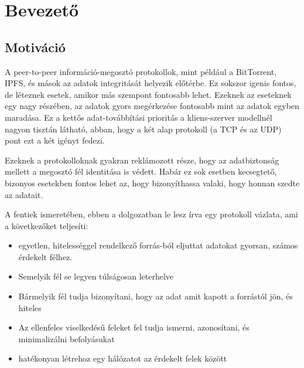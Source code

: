 \chapter{Bevezet\H{o}}\label{ch:BEV}

\section{Motiváció}\label{sec:BEV:mot}

A peer-to-peer információ-megosztó protokollok,
mint például a BitTorrent, IPFS, és mások az
adatok integritását helyezik el\H{o}térbe. Ez
sokszor igenis fontos, de léteznek esetek,
amikor más szempont fontosabb lehet. Ezeknek az
eseteknek egy nagy részében, az adatok gyors
megérkezése fontosabb mint az adatok egyben
maradása. Ez a kett\H{o}s adat-továbbítási
prioritás a kliens-szerver modellnél nagyon
tisztán látható, abban, hogy a két alap
protokoll (a TCP és az UDP) pont ezt a két
igényt fedezi.

Ezeknek a protokolloknak gyakran reklámozott
része, hogy az adatbiztonság mellett a megosztó
fél identitása is védett. Habár ez sok esetben
kecsegtet\H{o}, bizonyos esetekben fontos lehet az,
hogy bizonyíthassa valaki, hogy honnan szedte az
adatait.

A fentiek ismeretében, ebben a dolgozatban le
lesz írva egy protokoll vázlata, ami a
következ\H{o}ket teljesíti:
\begin{itemize}
\item egyetlen, hitelességgel rendelkez\H{o}
forrás-ból eljuttat adatokat gyorsan, számos
érdekelt félhez.
\item Semelyik fél se legyen túlságosan
leterhelve
\item Bármelyik fél tudja bizonyítani, hogy az
adat amit kapott a forrástól jön, és hiteles
\item Az ellenfeles viselkedés\H{u} feleket fel
tudja ismerni, azonosítani, és minimalizálni
befolyásukat
\item hatékonyan létrehoz egy hálózatot az
érdekelt felek között
\end{itemize}

